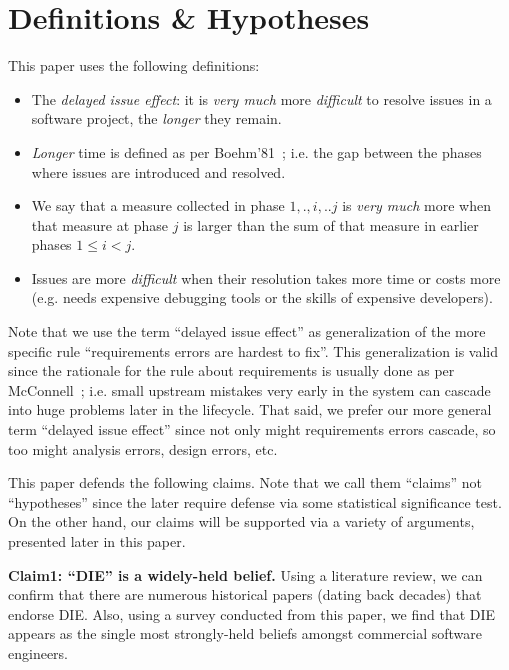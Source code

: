 \documentclass[smallcondesed]{svjour3}
\newcommand{\bi}{\begin{itemize}}%
\newcommand{\ei}{\end{itemize}}
\begin{document}
 








 
\section{Definitions \& Hypotheses}
This paper uses the following definitions:
\bi
\item
The {\em delayed issue effect}:   it is {\em very much}  more {\em difficult} to resolve  issues in a software project, the {\em longer} they remain.
\item
 {\em Longer} time is defined as per  Boehm'81~\cite{Boehm81}; i.e. the gap between the   phases where   issues are introduced and resolved.
\item
We say that a measure collected in phase ${1,.,i,..j}$ is 
{\em very much} more when  that
   measure at phase $j$   
   is larger than the sum of that measure in 
earlier phases $1 \le i < j$. 
\item
Issues are more {\em difficult}  
when their resolution takes more time or costs more  (e.g. needs expensive
debugging tools or the skills of expensive developers).
\ei
Note that we use  the  term ``delayed issue effect'' as generalization of the
more specific rule  ``requirements errors are hardest to fix''.
This generalization is valid since the rationale for the rule about requirements
is usually done as per McConnell~\cite{mcconnell01}; i.e. small upstream mistakes very
early in the system can cascade into huge problems later in the lifecycle.
That said, we prefer our more general term ``delayed issue effect'' since not
only might requirements errors cascade, so too might analysis errors, design errors, etc.



This paper defends the  following claims. Note that we call them
``claims'' not ``hypotheses'' since the later require defense via some statistical
significance test. On the other hand, our claims will be supported via a variety
of arguments, presented later in this paper.

{\bf  Claim1: ``DIE'' is a  widely-held belief.}
Using a literature review, we can confirm that there are numerous historical papers (dating back decades)
that endorse DIE. Also, using a survey conducted from this paper, we find  that 
  DIE  appears as the
single most strongly-held beliefs amongst commercial software engineers.
\end{document}
